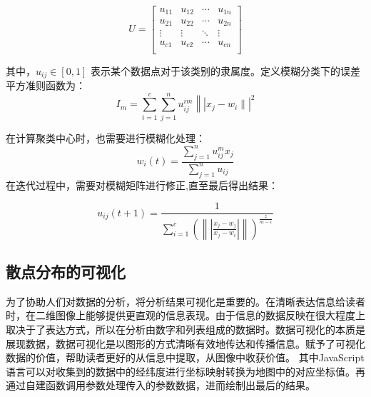 \begin{equation}
U=\begin{bmatrix}
u_{11} & u_{12} & \cdots & u_{1n}\\
u_{21} & u_{22} & \cdots & u_{2n} \\
\vdots  & \vdots  & \ddots  &\vdots  \\
u_{c1} & u_{c2} & \cdots & u_{cn} \\
\end{bmatrix}
\end{equation}

\par 其中，$u_{ij} \in [0,1]$ 表示某个数据点对于该类别的隶属度。定义模糊分类下的误差平方准则函数为：
\begin{equation}
I_{m}=\sum_{i=1}^{c} \sum_{j=1}^{n} u_{i j}^{i m}\left\|\left|x_{j}-w_{i} \|\right|^{2}\right.
\end{equation}

\par 在计算聚类中心时，也需要进行模糊化处理：
\begin{equation}
    w_{i}(t)=\frac{\sum_{j=1}^{n}u_{ij}^{m}x_{j}}{\sum_{j=1}^{n}u_{ij}}
\end{equation}
在迭代过程中，需要对模糊矩阵进行修正,直至最后得出结果：
 
\begin{equation}
    u_{ij}(t+1) = \frac{1}{\sum_{i=1}^{c} (\left \| \left | \frac{x_{j}-w_{j}  }{x_{j}-w_{i}}  \right |  \right \| )^{\frac{z}{m-i}}} 
    \end{equation}
\subsection{散点分布的可视化}
\par 为了协助人们对数据的分析，将分析结果可视化是重要的。在清晰表达信息给读者时，在二维图像上能够提供更直观的信息表现。由于信息的数据反映在很大程度上取决于了表达方式，所以在分析由数字和列表组成的数据时。数据可视化的本质是展现数据，数据可视化是以图形的方式清晰有效地传达和传播信息。赋予了可视化数据的价值，帮助读者更好的从信息中提取，从图像中收获价值。
其中JavaScript语言可以对收集到的数据中的经纬度进行坐标映射转换为地图中的对应坐标值。再通过自建函数调用参数处理传入的参数数据，进而绘制出最后的结果。

